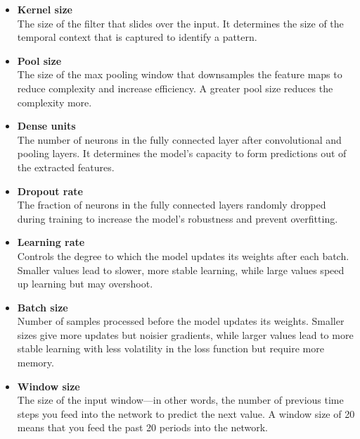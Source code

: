 \documentclass[a4paper,12pt]{report}
\begin{document}
\begin{itemize}

  \item \textbf{Kernel size} \\
  The size of the filter that slides over the input. It determines the size of the temporal context that is captured to identify a pattern.

  \item \textbf{Pool size} \\
  The size of the max pooling window that downsamples the feature maps to reduce complexity and increase efficiency. A greater pool size reduces the complexity more.

  \item \textbf{Dense units} \\
  The number of neurons in the fully connected layer after convolutional and pooling layers. It determines the model’s capacity to form predictions out of the extracted features.

  \item \textbf{Dropout rate} \\
  The fraction of neurons in the fully connected layers randomly dropped during training to increase the model’s robustness and prevent overfitting.

  \item \textbf{Learning rate} \\
  Controls the degree to which the model updates its weights after each batch. Smaller values lead to slower, more stable learning, while large values speed up learning but may overshoot.

  \item \textbf{Batch size} \\
  Number of samples processed before the model updates its weights. Smaller sizes give more updates but noisier gradients, while larger values lead to more stable learning with less volatility in the loss function but require more memory.

  \item \textbf{Window size} \\
  The size of the input window—in other words, the number of previous time steps you feed into the network to predict the next value. A window size of 20 means that you feed the past 20 periods into the network.
\end{itemize}
\end{document}
